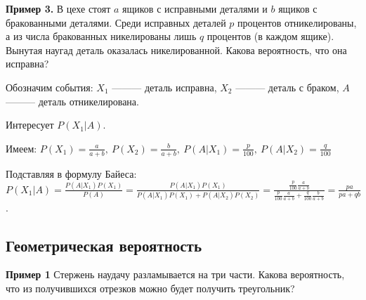 \documentclass{article}
\begin{document}
    \textbf{Пример 3.} В цехе стоят $a$ ящиков с исправными деталями и $b$ ящиков с бракованными деталями. Среди исправных деталей $p$ процентов отникелированы, а из числа бракованных никелированы лишь $q$ процентов (в каждом ящике). Вынутая наугад деталь оказалась никелированной. Какова вероятность, что она исправна?

    Обозначим события: $X_1$ ——— деталь исправна, $X_2$ ——— деталь с браком, $A$ ——— деталь отникелирована.

    Интересует \(P(X_1|A)\).

    Имеем: \( P(X_1) = \frac{a}{a + b}, \ P(X_2) = \frac{b}{a + b},  \ P(A|X_1) = \frac{p}{100},  \ P(A|X_2) = \frac{q}{100}\)

    Подставляя в формулу Байеса: \( P(X_1|A) = \frac{P(A|X_1)P(X_1)}{P(A)} = \frac{P(A|X_1)P(X_1)}{P(A|X_1)P(X_1)+P(A|X_2)P(X_2)} = \frac{ \frac{p}{100} \frac{a}{a + b} }{ \frac{p}{100} \frac{a}{a + b} + \frac{q}{100} \frac{b}{a + b}} = \frac{pa}{pa + qb}\).




    \subsection{Геометрическая вероятность}
    \textbf{Пример 1}  Стержень наудачу разламывается на три части. Какова вероятность, что из получившихся отрезков можно будет получить треугольник?
\end{document}
